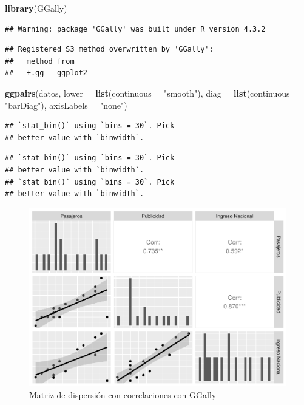 \documentclass[
]{book}
\newenvironment{Shaded}{\begin{snugshade}}{\end{snugshade}}
\newcommand{\AttributeTok}[1]{\textcolor[rgb]{0.13,0.29,0.53}{#1}}
\newcommand{\FunctionTok}[1]{\textcolor[rgb]{0.13,0.29,0.53}{\textbf{#1}}}
\newcommand{\NormalTok}[1]{#1}
\newcommand{\StringTok}[1]{\textcolor[rgb]{0.31,0.60,0.02}{#1}}
\begin{document}
\begin{Shaded}
\begin{Highlighting}[]
\FunctionTok{library}\NormalTok{(GGally)}
\end{Highlighting}
\end{Shaded}

\begin{verbatim}
## Warning: package 'GGally' was built under R version 4.3.2
\end{verbatim}

\begin{verbatim}
## Registered S3 method overwritten by 'GGally':
##   method from   
##   +.gg   ggplot2
\end{verbatim}

\begin{Shaded}
\begin{Highlighting}[]
\FunctionTok{ggpairs}\NormalTok{(datos, }\AttributeTok{lower =} \FunctionTok{list}\NormalTok{(}\AttributeTok{continuous =} \StringTok{"smooth"}\NormalTok{),}
        \AttributeTok{diag =} \FunctionTok{list}\NormalTok{(}\AttributeTok{continuous =} \StringTok{"barDiag"}\NormalTok{), }\AttributeTok{axisLabels =} \StringTok{"none"}\NormalTok{)}
\end{Highlighting}
\end{Shaded}

\begin{verbatim}
## `stat_bin()` using `bins = 30`. Pick
## better value with `binwidth`.
\end{verbatim}

\begin{verbatim}
## `stat_bin()` using `bins = 30`. Pick
## better value with `binwidth`.
## `stat_bin()` using `bins = 30`. Pick
## better value with `binwidth`.
\end{verbatim}

\begin{figure}
\centering
\includegraphics{_main_files/figure-latex/explorvar-1.pdf}
\caption{\label{fig:explorvar}Matriz de dispersión con correlaciones con GGally}
\end{figure}
\end{document}

